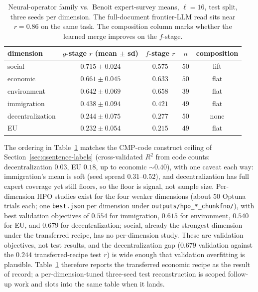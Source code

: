 \begin{table}[htbp]
    \centering
    \begin{tabular}{lcccc}
    \toprule
    dimension & $g$-stage $r$ (mean $\pm$ sd) & $f$-stage $r$ & $n$ & composition \\
    \midrule
    social           & $\mathbf{0.715 \pm 0.024}$ & $0.575$ & $50$ & lift \\
    economic         & $0.661 \pm 0.045$ & $0.633$ & $50$ & flat \\
    environment      & $0.642 \pm 0.069$ & $0.658$ & $39$ & flat \\
    immigration      & $0.438 \pm 0.094$ & $0.421$ & $49$ & flat \\
    decentralization & $0.244 \pm 0.075$ & $0.277$ & $50$ & none \\
    EU               & $0.232 \pm 0.054$ & $0.215$ & $49$ & flat \\
    \bottomrule
    \end{tabular}
    \caption{Neural-operator family vs.\ Benoit expert-survey means,
    $\ell = 16$, test split, three seeds per dimension. The
    full-document frontier-LLM read sits near $r = 0.86$ on the same
    task. The composition column marks whether the learned merge
    improves on the $f$-stage.}
    \label{tab:app-benoit-6dim-fno}
\end{table}

The ordering in Table~\ref{tab:app-benoit-6dim-fno} matches the
CMP-code construct ceiling of Section~\ref{sec:qsentence-labels}
(cross-validated $R^2$ from code counts: decentralization $0.03$, EU
$0.18$, up to economic $\sim 0.40$), with one caveat each way:
immigration's mean is soft (seed spread $0.31$--$0.52$), and
decentralization has full expert coverage yet still floors, so the
floor is signal, not sample size. Per-dimension HPO studies exist for
the four weaker dimensions (about $50$ Optuna trials each; one
\texttt{best.json} per dimension under
\texttt{outputs/hpo\_*\_chunkfno/}), with best validation objectives of
$0.554$ for immigration, $0.615$ for environment, $0.540$ for EU, and
$0.679$ for decentralization; social, already the strongest dimension
under the transferred recipe, has no per-dimension study. These are
validation objectives, not test results, and the decentralization gap
($0.679$ validation against the $0.244$ transferred-recipe test $r$) is
wide enough that validation overfitting is plausible.
Table~\ref{tab:app-benoit-6dim-fno} therefore reports the transferred
economic recipe as the result of record; a per-dimension-tuned
three-seed test reconstruction is scoped follow-up work and slots into
the same table when it lands.
